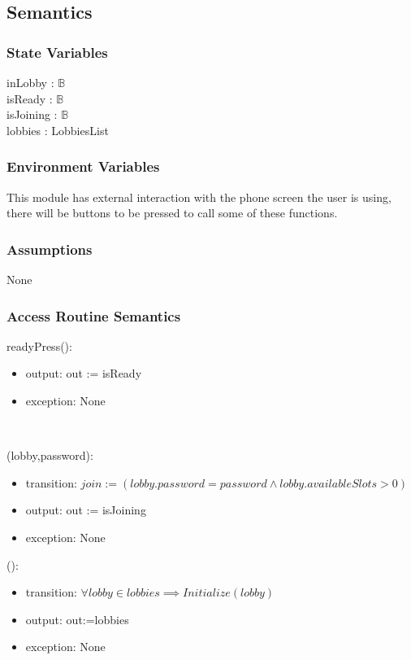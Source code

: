 \documentclass[12pt, titlepage]{article}
\begin{document}
\subsection{Semantics}

\subsubsection{State Variables}

inLobby : $\mathbb{B}$\\
isReady : $\mathbb{B}$\\
isJoining : $\mathbb{B}$\\
lobbies : LobbiesList

\subsubsection{Environment Variables}

This module has external interaction with the phone screen the user is using, there will be buttons to be pressed to call some of these functions.

\subsubsection{Assumptions}

None

\subsubsection{Access Routine Semantics}

\noindent readyPress():
\begin{itemize}
\item output: out := isReady
\item exception: None
\end{itemize}\

(lobby,password):
\begin{itemize}
\item transition: $join := (lobby.password=password \land lobby.availableSlots>0)$
\item output: out := isJoining
\item exception: None
\end{itemize}

():
\begin{itemize}
\item transition: $\forall lobby \in lobbies \implies Initialize(lobby)$
\item output: out:=lobbies
\item exception: None
\end{itemize}
\end{document}
